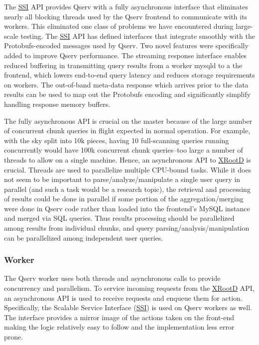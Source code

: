\documentclass[DM,lsstdraft,toc]{lsstdoc}
\begin{document}
The \href{}{SSI} API provides Qserv with a fully asynchronous interface
that eliminates nearly all blocking threads used by the Qserv frontend
to communicate with its workers. This eliminated one class of problems
we have encountered during large-scale testing. The \href{}{SSI} API has
defined interfaces that integrate smoothly with the Protobufs-encoded
messages used by Qserv. Two novel features were specifically added to
improve Qserv performance. The streaming response interface enables
reduced buffering in transmitting query results from a worker mysqld to
a the frontend, which lowers end-to-end query latency and reduces
storage requirements on workers. The out-of-band meta-data response
which arrives prior to the data results can be used to map out the
Protobufs encoding and significantly simplify handling response memory
buffers.

The fully asynchronous API is crucial on the master because of the large
number of concurrent chunk queries in flight expected in normal
operation. For example, with the sky split into 10k pieces, having 10
full-scanning queries running concurrently would have 100k concurrent
chunk queries--too large a number of threads to allow on a single
machine. Hence, an asynchronous API to \href{http://xrootd.org}{XRootD}
is crucial. Threads are used to parallelize multiple CPU-bound tasks.
While it does not seem to be important to parse/analyze/manipulate a
single user query in parallel (and such a task would be a research
topic), the retrieval and processing of results could be done in
parallel if some portion of the aggregation/merging were done in Qserv
code rather than loaded into the frontend's MySQL instance and merged
via SQL queries. Thus results processing should be parallelized among
results from individual chunks, and query parsing/analysis/manipulation
can be parallelized among independent user queries.

\subsubsection{Worker}\label{worker}

The Qserv worker uses both threads and asynchronous calls to provide
concurrency and parallelism. To service incoming requests from the
\href{http://xrootd.org}{XRootD} API, an asynchronous API is used to
receive requests and enqueue them for action. Specifically, the Scalable
Service Interface (\href{}{SSI}) is used on Qserv workers as well. The
interface provides a mirror image of the actions taken on the front-end
making the logic relatively easy to follow and the implementation less
error prone.
\end{document}
